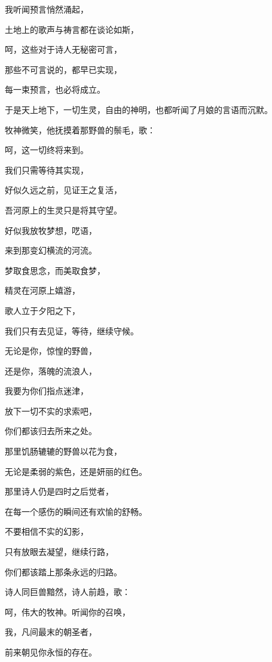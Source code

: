 \documentclass[UTF8]{article}
\begin{document}
\par 我听闻预言悄然涌起，
\par 土地上的歌声与祷言都在谈论如斯，
\par 呵，这些对于诗人无秘密可言，
\par 那些不可言说的，都早已实现，
\par 每一束预言，也必将成立。
\\[0.6cm]
\par 于是天上地下，一切生灵，自由的神明，也都听闻了月娘的言语而沉默。
\\[0.6cm]
\par 牧神微笑，他抚摸着那野兽的鬃毛，歌：
\\[0.6cm]
\par 呵，这一切终将来到。
\par 我们只需等待其实现，
\par 好似久远之前，见证王之复活，
\par 吾河原上的生灵只是将其守望。
\par 好似我放牧梦想，呓语，
\par 来到那变幻横流的河流。
\par 梦取食思念，而美取食梦，
\par 精灵在河原上嬉游，
\par 歌人立于夕阳之下，
\par 我们只有去见证，等待，继续守候。
\par 无论是你，惊惶的野兽，
\par 还是你，落魄的流浪人，
\par 我要为你们指点迷津，
\par 放下一切不实的求索吧，
\par 你们都该归去所来之处。
\par 那里饥肠辘辘的野兽以花为食，
\par 无论是柔弱的紫色，还是妍丽的红色。
\par 那里诗人仍是四时之后觉者，
\par 在每一个感伤的瞬间还有欢愉的舒畅。
\par 不要相信不实的幻影，
\par 只有放眼去凝望，继续行路，
\par 你们都该踏上那条永远的归路。
\\[0.6cm]
\par 诗人同巨兽黯然，诗人前趋，歌：
\\[0.6cm]
\par 呵，伟大的牧神。听闻你的召唤，
\par 我，凡间最末的朝圣者，
\par 前来朝见你永恒的存在。
\end{document}
